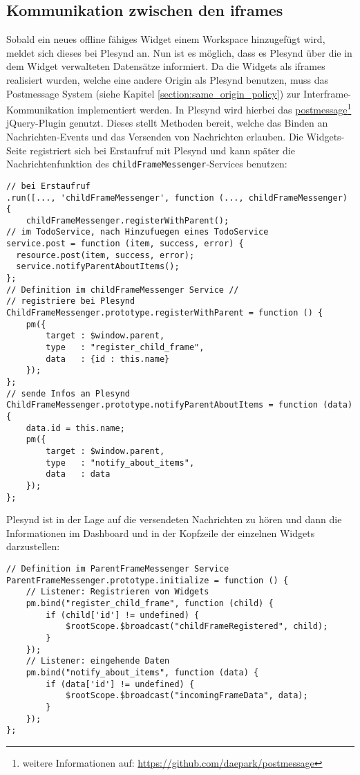 \subsection{Kommunikation zwischen den iframes}\label{section:kommunikation_zwischen_iframes_implementierung}
Sobald ein neues offline fähiges Widget einem Workspace hinzugefügt wird, meldet sich dieses bei Plesynd an. Nun ist es möglich, dass es Plesynd über die in dem Widget verwalteten Datensätze informiert. Da die Widgets als iframes realisiert wurden, welche eine andere Origin als Plesynd benutzen, muss das Postmessage System (siehe Kapitel \ref{section:same_origin_policy}) zur Interframe-Kommunikation implementiert werden. In Plesynd wird hierbei das \href{https://github.com/daepark/postmessage}{postmessage}\footnote{weitere Informationen auf: \url{https://github.com/daepark/postmessage}} jQuery-Plugin genutzt. Dieses stellt Methoden bereit, welche das Binden an Nachrichten-Events und das Versenden von Nachrichten erlauben. Die Widgets-Seite registriert sich bei Erstaufruf mit Plesynd und kann später die Nachrichtenfunktion des \texttt{childFrameMessenger}-Services benutzen:
\begin{lstlisting}
// bei Erstaufruf
.run([..., 'childFrameMessenger', function (..., childFrameMessenger) {
    childFrameMessenger.registerWithParent();
// im TodoService, nach Hinzufuegen eines TodoService
service.post = function (item, success, error) {
  resource.post(item, success, error);
  service.notifyParentAboutItems();
};
// Definition im childFrameMessenger Service //
// registriere bei Plesynd
ChildFrameMessenger.prototype.registerWithParent = function () {
    pm({
        target : $window.parent,
        type   : "register_child_frame",
        data   : {id : this.name}
    });
};
// sende Infos an Plesynd
ChildFrameMessenger.prototype.notifyParentAboutItems = function (data) {
    data.id = this.name;
    pm({
        target : $window.parent,
        type   : "notify_about_items",
        data   : data
    });
};
\end{lstlisting}

Plesynd ist in der Lage auf die versendeten Nachrichten zu hören und dann die Informationen im Dashboard und in der Kopfzeile der einzelnen Widgets darzustellen:
\begin{lstlisting}
// Definition im ParentFrameMessenger Service
ParentFrameMessenger.prototype.initialize = function () {
    // Listener: Registrieren von Widgets
    pm.bind("register_child_frame", function (child) {
        if (child['id'] != undefined) {
            $rootScope.$broadcast("childFrameRegistered", child);
        }
    });
    // Listener: eingehende Daten
    pm.bind("notify_about_items", function (data) {
        if (data['id'] != undefined) {
            $rootScope.$broadcast("incomingFrameData", data);
        }
    });
};
\end{lstlisting}

